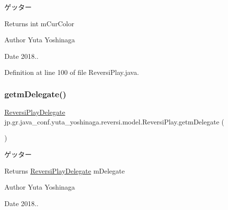 ゲッター 

\begin{DoxyReturn}{Returns}
int m\+Cur\+Color 
\end{DoxyReturn}
\begin{DoxyAuthor}{Author}
Yuta Yoshinaga 
\end{DoxyAuthor}
\begin{DoxyDate}{Date}
2018.. 
\end{DoxyDate}


Definition at line 100 of file Reversi\+Play.\+java.

\mbox{\label{classjp_1_1gr_1_1java__conf_1_1yuta__yoshinaga_1_1reversi_1_1model_1_1_reversi_play_a743606fc2f261d7303c76264c42c2ab0}} 
\subsubsection{\texorpdfstring{getm\+Delegate()}{getmDelegate()}}
{\footnotesize\ttfamily \hyperlink{classjp_1_1gr_1_1java__conf_1_1yuta__yoshinaga_1_1reversi_1_1model_1_1_reversi_play_delegate}{Reversi\+Play\+Delegate} jp.\+gr.\+java\+\_\+conf.\+yuta\+\_\+yoshinaga.\+reversi.\+model.\+Reversi\+Play.\+getm\+Delegate (\begin{DoxyParamCaption}{ }\end{DoxyParamCaption})}



ゲッター 

\begin{DoxyReturn}{Returns}
\hyperlink{classjp_1_1gr_1_1java__conf_1_1yuta__yoshinaga_1_1reversi_1_1model_1_1_reversi_play_delegate}{Reversi\+Play\+Delegate} m\+Delegate 
\end{DoxyReturn}
\begin{DoxyAuthor}{Author}
Yuta Yoshinaga 
\end{DoxyAuthor}
\begin{DoxyDate}{Date}
2018.. 
\end{DoxyDate}


